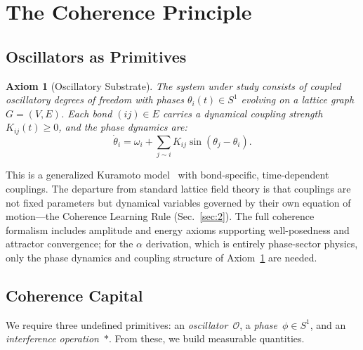 \documentclass[aps,prd,onecolumn,superscriptaddress,floatfix,12pt]{revtex4-2}
\newtheorem{axiom}{Axiom}
\begin{document}
\maketitle

\section{The Coherence Principle}\label{sec:1}

\subsection{Oscillators as Primitives}\label{sec:1-1}

\begin{axiom}[Oscillatory Substrate]\label{ax:substrate}
The system under study consists of coupled oscillatory degrees of freedom with phases $\theta_i(t) \in S^1$ evolving on a lattice graph $G = (V, E)$. Each bond $(ij) \in E$ carries a dynamical coupling strength $K_{ij}(t) \geq 0$, and the phase dynamics are:
\begin{equation}\label{eq:kuramoto}
\dot{\theta}_i = \omega_i + \sum_{j \sim i} K_{ij} \sin(\theta_j - \theta_i).
\end{equation}
\end{axiom}

This is a generalized Kuramoto model~\cite{Kuramoto1984} with bond-specific, time-dependent couplings. The departure from standard lattice field theory is that couplings are not fixed parameters but dynamical variables governed by their own equation of motion---the Coherence Learning Rule (Sec.~\ref{sec:2}). The full coherence formalism includes amplitude and energy axioms supporting well-posedness and attractor convergence; for the $\alpha$ derivation, which is entirely phase-sector physics, only the phase dynamics and coupling structure of Axiom~\ref{ax:substrate} are needed.

\subsection{Coherence Capital}\label{sec:1-2}

We require three undefined primitives: an \emph{oscillator}~$\mathcal{O}$, a \emph{phase}~$\phi \in S^1$, and an \emph{interference operation}~$\ast$. From these, we build measurable quantities.
\end{document}
